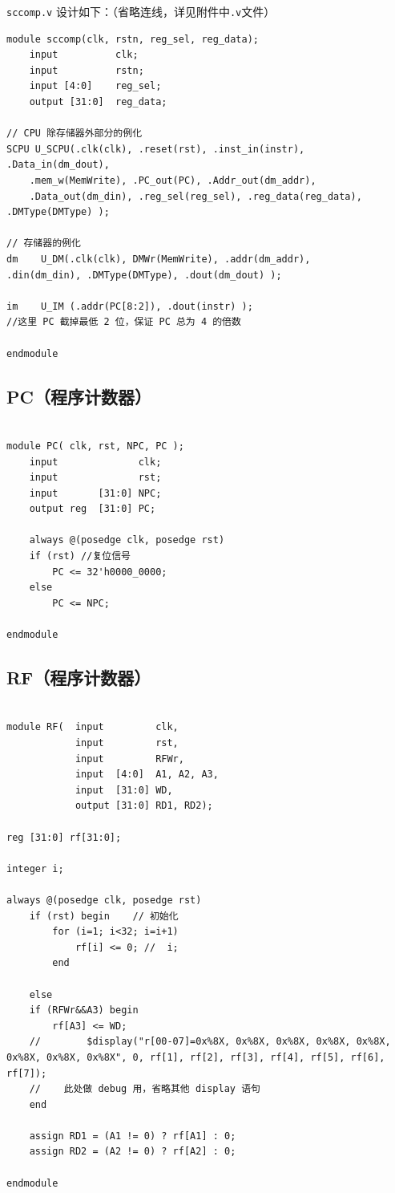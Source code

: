 \documentclass[UTF8,a4paper,autofakebold,15pt]{ctexart}
\begin{document}
{\tt sccomp.v} 设计如下：（省略连线，详见附件中{\tt .v}文件）

{\lstset{language=verilog}
	\begin{lstlisting}
module sccomp(clk, rstn, reg_sel, reg_data);
	input          clk;
	input          rstn;
	input [4:0]    reg_sel;
	output [31:0]  reg_data;

// CPU 除存储器外部分的例化
SCPU U_SCPU(.clk(clk), .reset(rst), .inst_in(instr), .Data_in(dm_dout),
	.mem_w(MemWrite), .PC_out(PC), .Addr_out(dm_addr),
	.Data_out(dm_din), .reg_sel(reg_sel), .reg_data(reg_data), .DMType(DMType) );

// 存储器的例化
dm    U_DM(.clk(clk), DMWr(MemWrite), .addr(dm_addr),
.din(dm_din), .DMType(DMType), .dout(dm_dout) );

im    U_IM (.addr(PC[8:2]), .dout(instr) );
//这里 PC 截掉最低 2 位，保证 PC 总为 4 的倍数

endmodule

\end{lstlisting}}


\subsection{PC（程序计数器）}

{\lstset{language=verilog}
	\begin{lstlisting}

module PC( clk, rst, NPC, PC );
	input              clk;
	input              rst;
	input       [31:0] NPC;
	output reg  [31:0] PC;

	always @(posedge clk, posedge rst)
	if (rst) //复位信号
		PC <= 32'h0000_0000;
	else
		PC <= NPC;

endmodule

\end{lstlisting}}

\subsection{RF（程序计数器）}

{\lstset{language=verilog}
	\begin{lstlisting}
		
module RF(  input         clk, 
			input         rst,
			input         RFWr, 
			input  [4:0]  A1, A2, A3, 
			input  [31:0] WD, 
			output [31:0] RD1, RD2);

reg [31:0] rf[31:0];

integer i;

always @(posedge clk, posedge rst)
	if (rst) begin    // 初始化
		for (i=1; i<32; i=i+1)
			rf[i] <= 0; //  i;
		end

	else 
	if (RFWr&&A3) begin
		rf[A3] <= WD;
	//        $display("r[00-07]=0x%8X, 0x%8X, 0x%8X, 0x%8X, 0x%8X, 0x%8X, 0x%8X, 0x%8X", 0, rf[1], rf[2], rf[3], rf[4], rf[5], rf[6], rf[7]);
	//    此处做 debug 用，省略其他 display 语句
	end
	
	assign RD1 = (A1 != 0) ? rf[A1] : 0;
	assign RD2 = (A2 != 0) ? rf[A2] : 0;

endmodule 
		
\end{lstlisting}}
\end{document}
